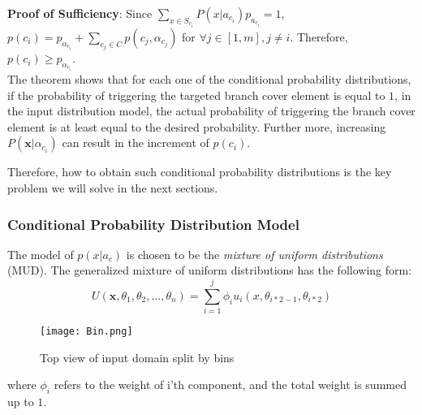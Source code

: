 \documentclass[journal]{IEEEtran}
\renewcommand{\vec}[1]{\mathbf{#1}}
\begin{document}
\textbf{\small Proof of Sufficiency}: Since \(\sum_{x \in S_{c_{i}}}P(x|a_{c_{i}})p_{a_{c_{i}}} = 1\), 
\(p(c_{i}) = p_{\alpha_{c_{i}}} + \sum_{c_{j}\in C} p(c_{j},\alpha_{c_{j}})\) for \(\forall j \in [1,m], j \neq i\). Therefore, \(p(c_{i}) \geq p_{\alpha_{c_{i}}}\).\\


The theorem shows that for each one of the conditional probability distributions, if the probability of triggering the targeted branch cover element is equal to \(1\), in the input distribution model, the actual probability of triggering the branch cover element is at least equal to the desired probability. Further more, increasing \(P(\vec{x}|\alpha_{c_{i}})\) can result in the increment of \(p(c_{i})\).

Therefore, how to obtain such conditional probability distributions is the key problem we will solve in the next sections. \\

\subsubsection {Conditional Probability Distribution Model}
The model of \(p(x|a_{c})\) is chosen to be the \emph{mixture of uniform distributions} (MUD).
The generalized mixture of uniform distributions has the following form:
\[U(\vec{x},\theta_{1},\theta_{2},...,\theta_{n}) = \sum_{i = 1}^{j}\phi_{i}u_{i}(x,\theta_{i*2-1},\theta_{i*2})\]

\begin{figure}[t]
	\hspace*{0.2cm}
	\texttt{[image: Bin.png]}
	\caption{Top view of input domain split by bins}
	\label{fig:bins}
\end{figure}
where \(\phi_{i}\) refers to the weight of i'th component, and the total weight is summed up to \(1\).
\end{document}
